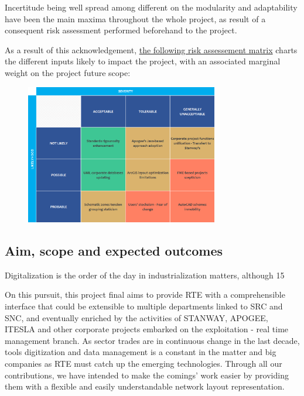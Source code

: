Incertitude being well spread among different  on the modularity and adaptability have been the main maxima throughout the whole project, as result of a consequent risk assessment performed beforehand to the project.

As a result of this acknowledgement, \hyperref[fig:risk-matrix]{the following risk assessement matrix} charts the different inputs likely to impact the project, with an associated marginal weight on the project future scope: 

\begin{figure}[h!]
    \centering
    \parbox[t]{0.75\textwidth}{
    \href{}{\includegraphics[width=0.75\textwidth]{0.figuras/risk-matrix.png}}
    \label{fig:risk-matrix}}
\end{figure}




\subsection{Aim, scope and expected outcomes}
\label{sec:Intro:Thesis-purpose:Outcomes}

Digitalization is the order of the day in industrialization matters, although 15

On this pursuit, this project final aims to provide RTE with a comprehensible interface that could be extensible to multiple departments linked to SRC and SNC, and eventually enriched by the activities of STANWAY, APOGEE, ITESLA and other corporate projects embarked on the exploitation - real time management branch.
As sector trades are in continuous change in the last decade, tools digitization and data management is a constant in the matter and big companies as RTE must catch up the emerging technologies. Through all our contributions, we have intended to make the comings' work easier by providing them with a flexible and easily understandable network layout representation.  

